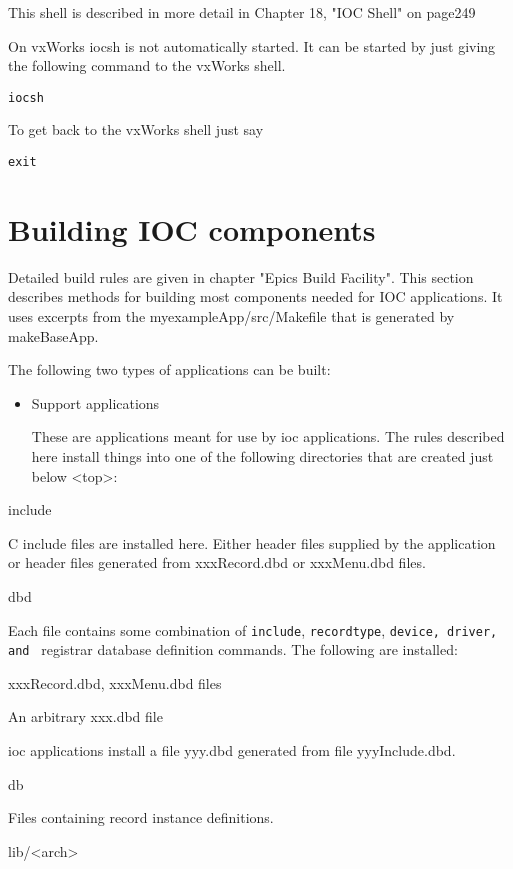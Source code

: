 This shell is described in more detail in Chapter 18, "IOC Shell" on page249

On vxWorks iocsh is not automatically started. It can be started by just giving the following command to the vxWorks 
shell.

\begin{verbatim}iocsh
\end{verbatim}To get back to the vxWorks shell just say

\begin{verbatim}exit
\end{verbatim}\section{Building IOC components}

Detailed build rules are given in chapter "Epics Build Facility". This section describes methods for building most 
components needed for IOC applications. It uses excerpts from the myexampleApp/src/Makefile that is generated by 
makeBaseApp.

The following two types of applications can be built:

\begin{itemize}\item Support applications

These are applications meant for use by ioc applications. The rules described here install things into one of the 
following directories that are created just below \textless{}top\textgreater{}:

\end{itemize}include

C include files are installed here. Either header files supplied by the application or header files generated 
from xxxRecord.dbd or xxxMenu.dbd files.

dbd

Each file contains some combination of \verb|include|, \verb|recordtype|, \verb|device, driver, and |
registrar database definition commands. The following are installed:

 xxxRecord.dbd, xxxMenu.dbd files

An arbitrary xxx.dbd file

 ioc applications install a file yyy.dbd generated from file yyyInclude.dbd.

db

Files containing record instance definitions. 

lib/\textless{}arch\textgreater{}


